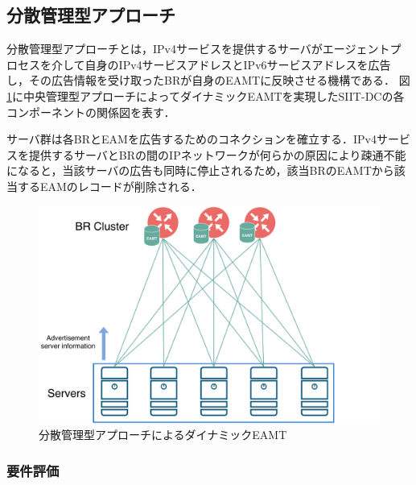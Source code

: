 \subsection{分散管理型アプローチ}
分散管理型アプローチとは，IPv4サービスを提供するサーバがエージェントプロセスを介して自身のIPv4サービスアドレスとIPv6サービスアドレスを広告し，その広告情報を受け取ったBRが自身のEAMTに反映させる機構である．
図\ref{fig:approach_distributed_model}に中央管理型アプローチによってダイナミックEAMTを実現したSIIT-DCの各コンポーネントの関係図を表す．

サーバ群は各BRとEAMを広告するためのコネクションを確立する．IPv4サービスを提供するサーバとBRの間のIPネットワークが何らかの原因により疎通不能になると，当該サーバの広告も同時に停止されるため，該当BRのEAMTから該当するEAMのレコードが削除される．



\begin{figure}[h]
    \begin{center}
      \includegraphics[width=12cm,pagebox=cropbox,clip]{img/approach_distributed_model.pdf}
    \end{center}
    \caption{分散管理型アプローチによるダイナミックEAMT}
    \label{fig:approach_distributed_model}
\end{figure}

\subsubsection{要件評価}

